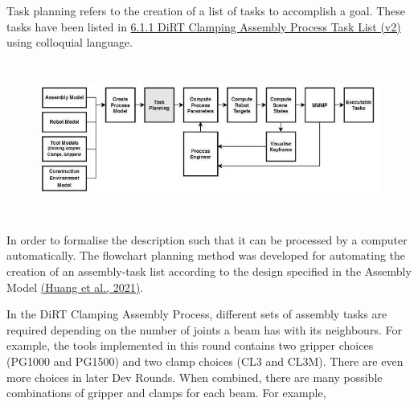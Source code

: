 \documentclass[11pt]{book}
\begin{document}
Task planning refers to the creation of a list of tasks to accomplish a goal. These tasks have been listed in \uline{6.1.1 DiRT Clamping Assembly Process Task List (v2)} using colloquial language.

\begin{figure}[H]
\includegraphics[width=15.92cm,height=5.12cm]{./images/image17.jpeg}
\end{figure}


In order to formalise the description such that it can be processed by a computer automatically. The flowchart planning method was developed for automating the creation of an assembly-task list according to the design specified in the Assembly Model \href{https://www.zotero.org/google-docs/?cKlfeU}{(Huang et al., 2021)}.

In the DiRT Clamping Assembly Process, different sets of assembly tasks are required depending on the number of joints a beam has with its neighbours. For example, the tools implemented in this round contains two gripper choices (PG1000 and PG1500) and two clamp choices (CL3 and CL3M). There are even more choices in later Dev Rounds. When combined, there are many possible combinations of gripper and clamps for each beam. For example,
\end{document}
